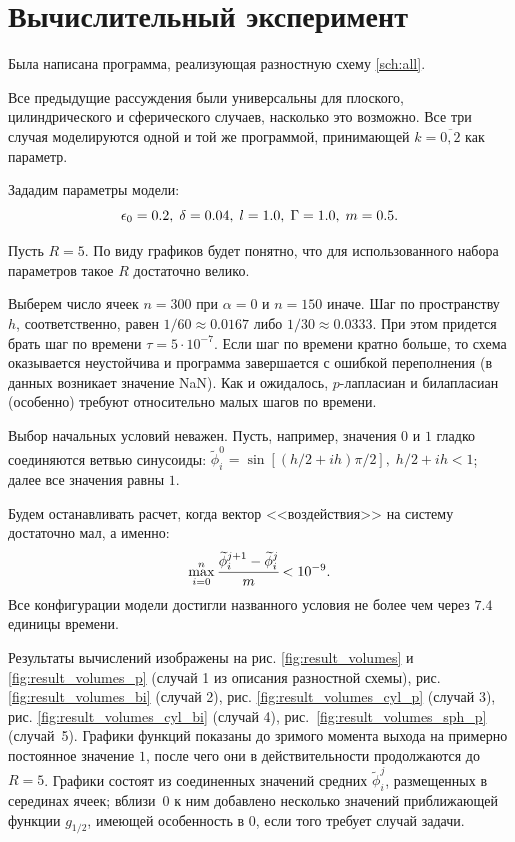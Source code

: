 
\section{Вычислительный эксперимент}

Была написана программа, реализующая разностную схему \eqref{sch:all}.

Все предыдущие рассуждения были универсальны для плоского, цилиндрического и сферического случаев, насколько это возможно. Все три случая моделируются одной и той же программой, принимающей $k = \overline{0, 2}$ как параметр.

Зададим параметры модели:
$$\epsilon_0 = 0.2, \; \delta = 0.04, \; l = 1.0, \; \Gamma = 1.0, \; m = 0.5 {\text{.}}$$

Пусть $R = 5$. По виду графиков будет понятно, что для использованного набора параметров такое $R$ достаточно велико.

Выберем число ячеек $n = 300$ при $\alpha = 0$ и $n = 150$ иначе. Шаг по пространству~$h$, соответственно, равен $1/60 \approx 0.0167$ либо $1/30 \approx 0.0333$. При этом придется брать шаг по времени $\tau = 5 \cdot 10^{-7}$. Если шаг по времени кратно больше, то схема оказывается неустойчива и программа завершается с ошибкой переполнения (в данных возникает значение NaN). Как и ожидалось, $p$-лапласиан и билапласиан (особенно) требуют относительно малых шагов по времени.

Выбор начальных условий неважен. Пусть, например, значения $0$ и $1$ гладко соединяются ветвью синусоиды: $\widetilde{\phi}_i^0 = \sin[(h/2 + ih) \pi / 2], \; h/2 + ih < 1$; далее все значения равны $1$.

Будем останавливать расчет, когда вектор <<воздействия>> на систему достаточно мал, а именно:
$$\max\limits_{i = 0}^n \cfrac{\widetilde{\phi}_i^{j + 1} - \widetilde{\phi}_i^j}{m} < 10^{-9} {\text{.}}$$
Все конфигурации модели достигли названного условия не более чем через $7.4$ единицы времени.

Результаты вычислений изображены на рис. \ref{fig:result_volumes} и \ref{fig:result_volumes_p} (случай 1 из описания разностной схемы), рис. \ref{fig:result_volumes_bi} (случай 2), рис. \ref{fig:result_volumes_cyl_p} (случай 3), рис. \ref{fig:result_volumes_cyl_bi} (случай 4), рис.~\ref{fig:result_volumes_sph_p} (случай~5). Графики функций показаны до зримого момента выхода на примерно постоянное значение $1$, после чего они в действительности продолжаются до $R = 5$. Графики состоят из соединенных значений средних $\widetilde{\phi}_i^j$, размещенных в серединах ячеек; вблизи~$0$ к ним добавлено несколько значений приближающей функции $g_{1/2}$, имеющей особенность в $0$, если того требует случай задачи.

